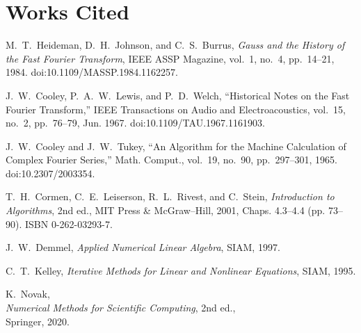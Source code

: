\documentclass[12pt]{article}
\begin{document}


\newpage
\section{Works Cited}
\begin{thebibliography}{9}

M.~T.~Heideman, D.~H.~Johnson, and C.~S.~Burrus,
\emph{Gauss and the History of the Fast Fourier Transform},
IEEE ASSP Magazine, vol.~1, no.~4, pp.~14–21, 1984.
doi:10.1109/MASSP.1984.1162257.

J.~W.~Cooley, P.~A.~W.~Lewis, and P.~D.~Welch,
“Historical Notes on the Fast Fourier Transform,”
IEEE Transactions on Audio and Electroacoustics, 
vol.~15, no.~2, pp.~76–79, Jun. 1967.
doi:10.1109/TAU.1967.1161903.

J.~W.~Cooley and J.~W.~Tukey,
“An Algorithm for the Machine Calculation of Complex Fourier Series,”
Math. Comput., vol.~19, no.~90, pp.~297–301, 1965.
doi:10.2307/2003354.

T.~H.~Cormen, C.~E.~Leiserson, R.~L.~Rivest, and C.~Stein,
\emph{Introduction to Algorithms}, 2nd ed.,
MIT Press & McGraw–Hill, 2001,
Chaps. 4.3–4.4 (pp. 73–90).
ISBN 0-262-03293-7.

J.~W.~Demmel,
\emph{Applied Numerical Linear Algebra},
SIAM, 1997.

C.~T.~Kelley,
\emph{Iterative Methods for Linear and Nonlinear Equations},
SIAM, 1995.

    K.~Novak,\\
    \emph{Numerical Methods for Scientific Computing}, 2nd ed.,\\
    Springer, 2020.

\end{thebibliography}
\end{document}
